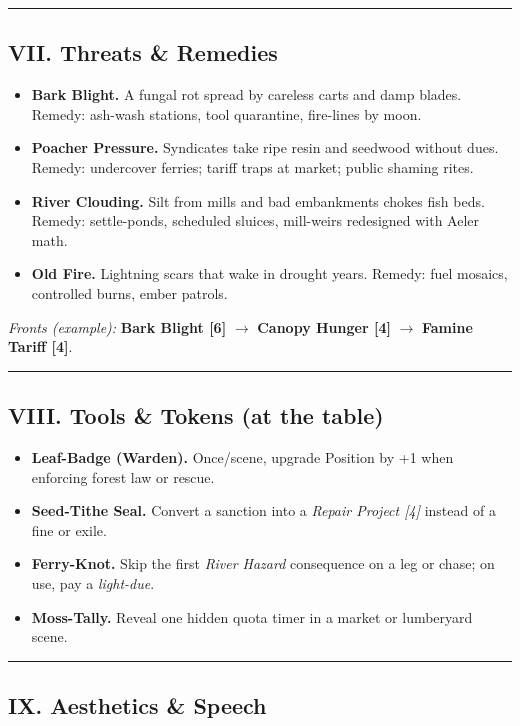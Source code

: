 \documentclass[11pt]{article}
\begin{document}
\medskip\hrule\medskip

\subsection{VII. Threats \& Remedies}

\begin{itemize}[leftmargin=*]
  \item \textbf{Bark Blight.} A fungal rot spread by careless carts and damp blades. Remedy: ash-wash stations, tool quarantine, fire-lines by moon.
  \item \textbf{Poacher Pressure.} Syndicates take ripe resin and seedwood without dues. Remedy: undercover ferries; tariff traps at market; public shaming rites.
  \item \textbf{River Clouding.} Silt from mills and bad embankments chokes fish beds. Remedy: settle-ponds, scheduled sluices, mill-weirs redesigned with Aeler math.
  \item \textbf{Old Fire.} Lightning scars that wake in drought years. Remedy: fuel mosaics, controlled burns, ember patrols.
\end{itemize}

\textit{Fronts (example):} \textbf{Bark Blight [6]} $\rightarrow$ \textbf{Canopy Hunger [4]} $\rightarrow$ \textbf{Famine Tariff [4]}.

\medskip\hrule\medskip

\subsection{VIII. Tools \& Tokens (at the table)}

\begin{itemize}[leftmargin=*]
  \item \textbf{Leaf-Badge (Warden).} Once/scene, upgrade Position by +1 when enforcing forest law or rescue.
  \item \textbf{Seed-Tithe Seal.} Convert a sanction into a \emph{Repair Project [4]} instead of a fine or exile.
  \item \textbf{Ferry-Knot.} Skip the first \emph{River Hazard} consequence on a leg or chase; on use, pay a \emph{light-due}.
  \item \textbf{Moss-Tally.} Reveal one hidden quota timer in a market or lumberyard scene.
\end{itemize}

\medskip\hrule\medskip

\subsection{IX. Aesthetics \& Speech}
\end{document}

